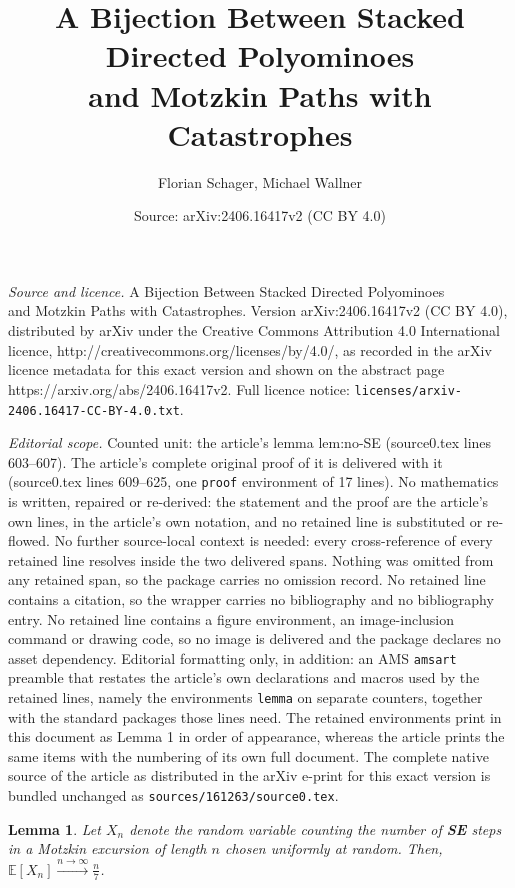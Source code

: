 \documentclass[10pt,a4paper]{amsart}
\title{A Bijection Between Stacked Directed Polyominoes \\ and Motzkin Paths with Catastrophes}
\author{Florian Schager, Michael Wallner}
\date{Source: arXiv:2406.16417v2 (CC BY 4.0)}
\newtheorem{lemma}{Lemma}
\begin{document}
\maketitle

\noindent\emph{Source and licence.} A Bijection Between Stacked Directed Polyominoes \\ and Motzkin Paths with Catastrophes. Version arXiv:2406.16417v2 (CC BY 4.0), distributed by arXiv under the Creative Commons Attribution 4.0 International licence, http://creativecommons.org/licenses/by/4.0/, as recorded in the arXiv licence metadata for this exact version and shown on the abstract page https://arxiv.org/abs/2406.16417v2. Full licence notice: \texttt{licenses/arxiv-2406.16417-CC-BY-4.0.txt}.\par\smallskip

\noindent\textit{Editorial scope.} Counted unit: the article's lemma lem:no-SE (source0.tex lines 603--607). The article's complete original proof of it is delivered with it (source0.tex lines 609--625, one \texttt{proof} environment of 17 lines). No mathematics is written, repaired or re-derived: the statement and the proof are the article's own lines, in the article's own notation, and no retained line is substituted or re-flowed.  No further source-local context is needed: every cross-reference of every retained line resolves inside the two delivered spans.  Nothing was omitted from any retained span, so the package carries no omission record.  No retained line contains a citation, so the wrapper carries no bibliography and no bibliography entry.  No retained line contains a figure environment, an image-inclusion command or drawing code, so no image is delivered and the package declares no asset dependency.  Editorial formatting only, in addition: an AMS \texttt{amsart} preamble that restates the article's own declarations and macros used by the retained lines, namely the environments \texttt{lemma} on separate counters, together with the standard packages those lines need.  The retained environments print in this document as Lemma 1 in order of appearance, whereas the article prints the same items with the numbering of its own full document.  The complete native source of the article as distributed in the arXiv e-print for this exact version is bundled unchanged as \texttt{sources/161263/source0.tex}.
\begin{lemma}
  \label{lem:no-SE}
  Let $X_n$ denote the random variable counting the number of \textbf{SE} steps in a Motzkin excursion of length $n$ chosen uniformly at random.
  Then, $\mathbb{E}[X_n] \xrightarrow[]{{n \to \infty}} \frac{n}{7}$.
\end{lemma}
\end{document}
